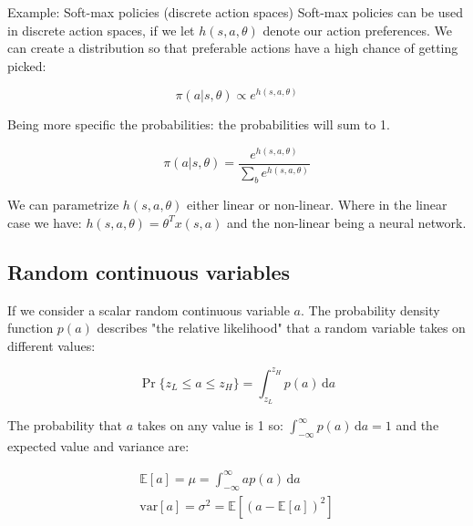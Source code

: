 \begin{example}{Example: Soft-max policies (discrete action spaces)}
Soft-max policies can be used in discrete action spaces, if we let $h(s,a,\theta)$ denote our action preferences. We can create a distribution so that preferable actions have a high chance of getting picked:

	\begin{equation*}
		\pi (a|s,\theta) \propto e^{h(s,a,\theta)}
	\end{equation*}

Being more specific the probabilities: the probabilities will sum to 1. 

	\begin{equation}
		\pi (a|s,\theta) = \frac{e^{h(s,a,\theta)}} {\sum_{b}^{}e^{h(s,a,\theta)}} 
	\end{equation}

We can parametrize $h(s,a,\theta)$ either linear or non-linear. Where in the linear case we have: $h(s,a,\theta) = \theta^{T}x(s,a)$ and the non-linear being a neural network. 

\end{example}	

\subsection{Random continuous variables}
If we consider a scalar random continuous variable $a$. The probability density function $p(a)$ describes "the relative likelihood" that a random variable takes on different values:

	\begin{equation}
		\Pr \{ z_L \le a \le z_H\} = \int_{z_L}^{z_H} p(a)\,\text{d}a
	\end{equation}

The probability that $a$ takes on any value is 1 so: $\int_{-\infty}^{\infty} p(a)\,\text{d}a = 1$ and the expected value and variance are:

	\begin{equation}
	\begin{aligned}
		\mathbb{E} [a] = \mu = \int_{-\infty}^{\infty} ap(a)\,\text{d}a \\
		\text{var} [a] = \sigma^{2} = \mathbb{E}[(a-\mathbb{E}[a])^{2}]
	\end{aligned}
	\end{equation}


